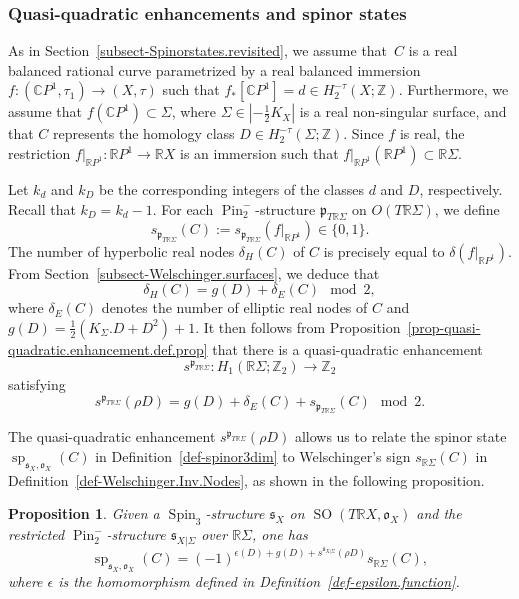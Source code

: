\documentclass[11pt]{amsart}
\numberwithin{equation}{section}
\theoremstyle{definition}
\theoremstyle{plain}
\newtheorem{proposition}[definition]{Proposition}
\theoremstyle{remark}
\newcommand{\R}{\mathbb{R}}
\newcommand{\Z}{\mathbb{Z}}
\newcommand{\C}{\mathbb{C}}
\DeclareMathOperator{\SO}{SO}
\DeclareMathOperator{\Pin}{Pin}
\DeclareMathOperator{\Spin}{Spin}
\renewcommand{\sp}{\operatorname{sp}}
\newcommand{\lra}{\longrightarrow}
\begin{document}
\subsubsection{Quasi-quadratic enhancements and spinor states}
As in Section~\ref{subsect-Spinorstates.revisited}, we assume that~$C$ is a real balanced rational curve parametrized by a real balanced immersion $f\colon (\C P^1,\tau_1)\to (X,\tau)$  such that $f_*[\C P^1]=d\in  H_2^{-\tau}(X;\Z)$. Furthermore, we assume that $f (\C P^1)\subset \Sigma$, where $\Sigma\in |-\frac{1}{2}K_X|$ is a real non-singular surface, and that $C$ represents the homology class $D\in H_2^{-\tau}(\Sigma;\Z)$. Since $f$ is real, the restriction $f|_{\R P^1}\colon  \R P^1 \to \R X$ is an immersion such that $f|_{\R P^1}(\R P^1)\subset \R \Sigma$.

Let $k_d$ and $k_D$ be the corresponding integers of the classes $d$ and $D$, respectively. Recall that $k_D=k_d-1$. For each $\Pin_2^-$-structure $\mathfrak{p}_{T\R \Sigma}$ on $O(T \R \Sigma)$, we define 
$$s_{\mathfrak{p}_{T\R \Sigma}}(C):=s_{\mathfrak{p}_{T\R \Sigma}}\left(f|_{\R P^1}\right) \in \{0,1\}.$$ 
The number of hyperbolic real nodes  $\delta_H(C)$ of $C$ is precisely equal to $\delta(f|_{\R P^1})$. From Section~\ref{subsect-Welschinger.surfaces}, we deduce that
$$\delta_H(C)= g(D)+\delta_E(C) \mod 2,$$
 where $\delta_E(C)$ denotes the number of elliptic real nodes of $C$ and $g(D)=\frac{1}{2}(K_\Sigma.D+D^2)+1$.
 It then follows from  Proposition~\ref{prop-quasi-quadratic.enhancement.def.prop}  that there is a quasi-quadratic enhancement
 $$s^{\mathfrak{p}_{T\R \Sigma}}\colon H_1(\R \Sigma;\Z_2)\lra \Z_2$$
 satisfying
 \begin{equation} \label{eq-RelationW2W2}
     s^{\mathfrak{p}_{T\R \Sigma}}(\rho D)= g(D)+\delta_E(C)+s_{\mathfrak{p}_{T\R \Sigma}}(C) \mod 2.
 \end{equation}


The quasi-quadratic enhancement $s^{\mathfrak{p}_{T\R \Sigma}}(\rho D)$ allows us to relate the spinor state $\sp_{\mathfrak{s}_X,\mathfrak{o}_X}(C)$ in  Definition~\ref{def-spinor3dim} to Welschinger's sign $s_{\R \Sigma}(C)$ in Definition~\ref{def-Welschinger.Inv.Nodes}, as shown in the following proposition.

\begin{proposition}\label{Prop-RelationW2W3}
Given  a $\Spin_3$-structure $\mathfrak{s}_X$  on $\SO(T\R X,\mathfrak{o}_X)$ and the restricted $\Pin_2^-$-structure  $\mathfrak{s}_{X|\Sigma}$ over $\R \Sigma$, one has
 \begin{equation} \label{eq-Prop-RelationW2W3}
     \sp_{\mathfrak{s}_X,\mathfrak{o}_X}(C)=(-1)^{\epsilon(D)+g(D)+s^{\mathfrak{s}_{X|\Sigma}}(\rho D)}s_{\R \Sigma}(C), 
 \end{equation}
 where  $\epsilon$ is the homomorphism defined in Definition~\ref{def-epsilon.function}.
 \end{proposition}
\end{document}
